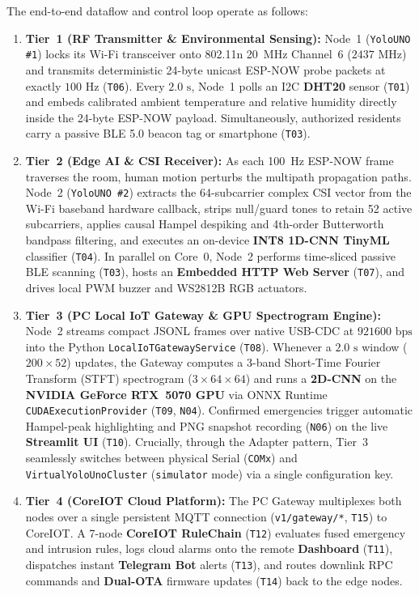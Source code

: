 \documentclass{hcmut-report}
\begin{document}
The end-to-end dataflow and control loop operate as follows:
\begin{enumerate}
  \item \textbf{Tier~1 (RF Transmitter \& Environmental Sensing):} Node~1 (\texttt{YoloUNO \#1}) locks its Wi-Fi transceiver onto 802.11n 20~MHz Channel~6 ($2437\text{ MHz}$) and transmits deterministic 24-byte unicast ESP-NOW probe packets at exactly $100\text{ Hz}$ (\texttt{T06}). Every $2.0\text{ s}$, Node~1 polls an I2C \textbf{DHT20} sensor (\texttt{T01}) and embeds calibrated ambient temperature and relative humidity directly inside the 24-byte ESP-NOW payload. Simultaneously, authorized residents carry a passive BLE 5.0 beacon tag or smartphone (\texttt{T03}).
  \item \textbf{Tier~2 (Edge AI \& CSI Receiver):} As each 100~Hz ESP-NOW frame traverses the room, human motion perturbs the multipath propagation paths. Node~2 (\texttt{YoloUNO \#2}) extracts the 64-subcarrier complex CSI vector from the Wi-Fi baseband hardware callback, strips null/guard tones to retain 52 active subcarriers, applies causal Hampel despiking and 4th-order Butterworth bandpass filtering, and executes an on-device \textbf{INT8 1D-CNN TinyML} classifier (\texttt{T04}). In parallel on Core~0, Node~2 performs time-sliced passive BLE scanning (\texttt{T03}), hosts an \textbf{Embedded HTTP Web Server} (\texttt{T07}), and drives local PWM buzzer and WS2812B RGB actuators.
  \item \textbf{Tier~3 (PC Local IoT Gateway \& GPU Spectrogram Engine):} Node~2 streams compact JSONL frames over native USB-CDC at $921600\text{ bps}$ into the Python \texttt{LocalIoTGatewayService} (\texttt{T08}). Whenever a $2.0\text{ s}$ window ($200\times 52$) updates, the Gateway computes a 3-band Short-Time Fourier Transform (STFT) spectrogram ($3\times 64\times 64$) and runs a \textbf{2D-CNN} on the \textbf{NVIDIA GeForce RTX~5070 GPU} via ONNX Runtime \texttt{CUDAExecutionProvider} (\texttt{T09}, \texttt{N04}). Confirmed emergencies trigger automatic Hampel-peak highlighting and PNG snapshot recording (\texttt{N06}) on the live \textbf{Streamlit UI} (\texttt{T10}). Crucially, through the Adapter pattern, Tier~3 seamlessly switches between physical Serial (\texttt{COMx}) and \texttt{VirtualYoloUnoCluster} (\texttt{simulator} mode) via a single configuration key.
  \item \textbf{Tier~4 (CoreIOT Cloud Platform):} The PC Gateway multiplexes both nodes over a single persistent MQTT connection (\texttt{v1/gateway/*}, \texttt{T15}) to CoreIOT. A 7-node \textbf{CoreIOT RuleChain} (\texttt{T12}) evaluates fused emergency and intrusion rules, logs cloud alarms onto the remote \textbf{Dashboard} (\texttt{T11}), dispatches instant \textbf{Telegram Bot} alerts (\texttt{T13}), and routes downlink RPC commands and \textbf{Dual-OTA} firmware updates (\texttt{T14}) back to the edge nodes.
\end{enumerate}
\end{document}
